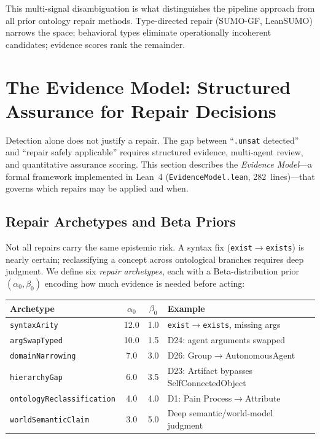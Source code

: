 \documentclass[11pt]{article}
\theoremstyle{definition}
\theoremstyle{plain}
\begin{document}
This multi-signal disambiguation is what distinguishes the pipeline
approach from all prior ontology repair methods.  Type-directed repair
(SUMO-GF, LeanSUMO) narrows the space; behavioral types eliminate
operationally incoherent candidates; evidence scores rank the remainder.

\section{The Evidence Model: Structured Assurance for Repair Decisions}
\label{sec:evidence-model}

Detection alone does not justify a repair.  The gap between
``\texttt{.unsat} detected'' and ``repair safely applicable'' requires
structured evidence, multi-agent review, and quantitative assurance
scoring.  This section describes the \emph{Evidence Model}---a formal
framework implemented in Lean~4 (\texttt{EvidenceModel.lean},
282~lines)---that governs which repairs may be applied and when.

\subsection{Repair Archetypes and Beta Priors}

Not all repairs carry the same epistemic risk.  A syntax fix
(\texttt{exist}$\to$\texttt{exists}) is nearly certain; reclassifying
a concept across ontological branches requires deep judgment.
We define six \emph{repair archetypes}, each with a Beta-distribution
prior $(\alpha_0, \beta_0)$ encoding how much evidence is needed
before acting:

\begin{center}\small
\begin{tabular}{@{}lccl@{}}
\toprule
\textbf{Archetype} & $\alpha_0$ & $\beta_0$ & \textbf{Example} \\
\midrule
\texttt{syntaxArity} & 12.0 & 1.0 & \texttt{exist}$\to$\texttt{exists}, missing args \\
\texttt{argSwapTyped} & 10.0 & 1.5 & D24: agent arguments swapped \\
\texttt{domainNarrowing} & 7.0 & 3.0 & D26: Group$\to$AutonomousAgent \\
\texttt{hierarchyGap} & 6.0 & 3.5 & D23: Artifact bypasses SelfConnectedObject \\
\texttt{ontologyReclassification} & 4.0 & 4.0 & D1: Pain Process$\to$Attribute \\
\texttt{worldSemanticClaim} & 3.0 & 5.0 & Deep semantic/world-model judgment \\
\bottomrule
\end{tabular}
\end{center}
\end{document}
